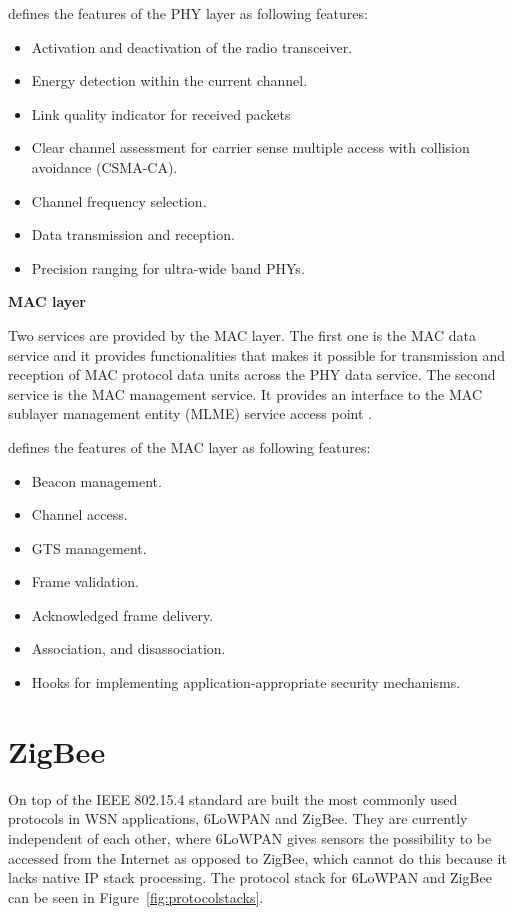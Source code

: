 \citet{7460875} defines the features of the PHY layer as following features: 

\begin{itemize}
   \item Activation and deactivation of the radio transceiver.
   \item Energy detection within the current channel.
   \item Link quality indicator for received packets
   \item Clear channel assessment for carrier sense multiple access with collision avoidance (CSMA-CA). 
   \item Channel frequency selection.
   \item Data transmission and reception.
   \item Precision ranging for ultra-wide band PHYs.
\end{itemize}

\vspace{5mm}
\textbf{MAC layer}

Two services are provided by the MAC layer. The first one is the MAC data service and it provides functionalities that makes it possible for transmission and reception of MAC protocol data units across the PHY data service. The second service is the MAC management service. It provides an interface to the MAC sublayer management entity (MLME) service access point \citep{7460875}.

\citet{7460875} defines the features of the MAC layer as following features: 

\begin{itemize}
   \item Beacon management.
   \item Channel access.
   \item GTS management.
   \item Frame validation. 
   \item Acknowledged frame delivery.
   \item Association, and disassociation.
   \item Hooks for implementing application-appropriate security mechanisms.
\end{itemize}



\section{ZigBee}
On top of the IEEE 802.15.4 standard are built the most commonly used protocols in WSN applications, 6LoWPAN and ZigBee. They are currently independent of each other, where 6LoWPAN gives sensors the possibility to be accessed from the Internet as opposed to ZigBee, which cannot do this because it lacks native IP stack processing. The protocol stack for 6LoWPAN and ZigBee can be seen in Figure~\ref{fig:protocolstacks}.

